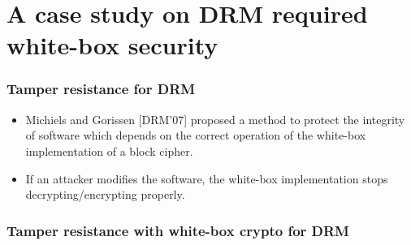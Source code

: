 \documentclass{beamer}
\begin{document}
\section{A case study on DRM required white-box security}

\frame
{
\frametitle{Tamper resistance for DRM}

\begin{itemize}
\item Michiels and Gorissen [DRM'07] proposed a method to protect the integrity of software which depends on the correct operation of the white-box implementation of a block cipher.
\item If an attacker modifies the software, the white-box implementation stops decrypting/encrypting properly. 
\end{itemize}

}

\frame
{
\frametitle{Tamper resistance with white-box crypto for DRM}

\begin{center}
\end{center}

}
\end{document}
